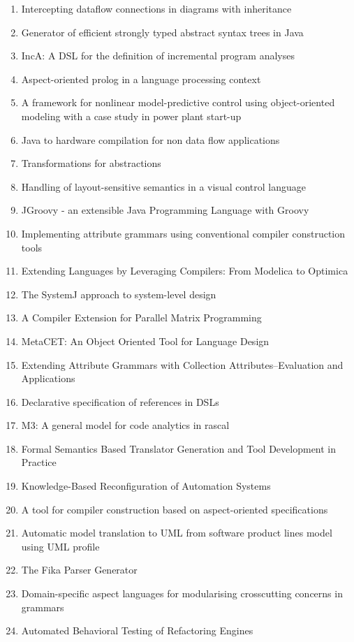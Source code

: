 \begin{enumerate}
\item Intercepting dataflow connections in diagrams with inheritance
\item Generator of efficient strongly typed abstract syntax trees in Java
\item IncA: A DSL for the definition of incremental program analyses
\item Aspect-oriented prolog in a language processing context
\item A framework for nonlinear model-predictive control using object-oriented modeling with a case study in power plant start-up
\item Java to hardware compilation for non data flow applications
\item Transformations for abstractions
\item Handling of layout-sensitive semantics in a visual control language
\item JGroovy - an extensible Java Programming Language with Groovy
\item Implementing attribute grammars using conventional compiler construction tools
\item Extending Languages by Leveraging Compilers: From Modelica to Optimica
\item The SystemJ approach to system-level design
\item A Compiler Extension for Parallel Matrix Programming
\item MetaCET: An Object Oriented Tool for Language Design
\item Extending Attribute Grammars with Collection Attributes--Evaluation and Applications
\item Declarative specification of references in DSLs
\item M3: A general model for code analytics in rascal
\item Formal Semantics Based Translator Generation and Tool Development in Practice
\item Knowledge-Based Reconfiguration of Automation Systems
\item A tool for compiler construction based on aspect-oriented specifications
\item Automatic model translation to UML from software product lines model using UML profile
\item The Fika Parser Generator
\item Domain-specific aspect languages for modularising crosscutting concerns in grammars
\item Automated Behavioral Testing of Refactoring Engines
\end{enumerate}

